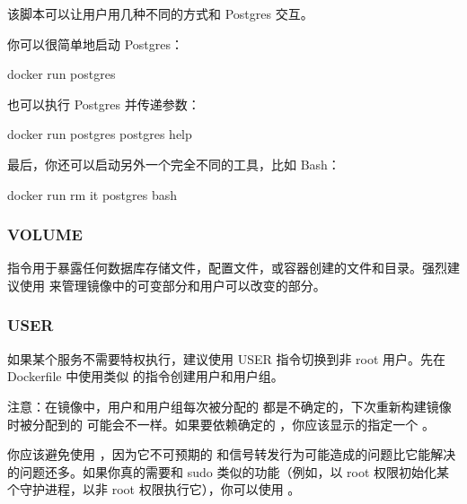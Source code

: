 \documentclass[letterpaper,10pt,english]{sphinxmanual}
\begin{document}
该脚本可以让用户用几种不同的方式和 Postgres 交互。

你可以很简单地启动 Postgres：

\begin{sphinxVerbatim}[commandchars=\\\{\}]
\PYGZdl{} docker run postgres
\end{sphinxVerbatim}

也可以执行 Postgres 并传递参数：

\begin{sphinxVerbatim}[commandchars=\\\{\}]
\PYGZdl{} docker run postgres postgres \PYGZhy{}\PYGZhy{}help
\end{sphinxVerbatim}

最后，你还可以启动另外一个完全不同的工具，比如 Bash：

\begin{sphinxVerbatim}[commandchars=\\\{\}]
\PYGZdl{} docker run \PYGZhy{}\PYGZhy{}rm \PYGZhy{}it postgres bash
\end{sphinxVerbatim}


\subsubsection{VOLUME}
\label{\detokenize{docker/appendix:volume}}
 指令用于暴露任何数据库存储文件，配置文件，或容器创建的文件和目录。强烈建议使用  来管理镜像中的可变部分和用户可以改变的部分。


\subsubsection{USER}
\label{\detokenize{docker/appendix:user}}
如果某个服务不需要特权执行，建议使用 USER 指令切换到非 root 用户。先在 Dockerfile 中使用类似  的指令创建用户和用户组。

注意：在镜像中，用户和用户组每次被分配的  都是不确定的，下次重新构建镜像时被分配到的  可能会不一样。如果要依赖确定的 ，你应该显示的指定一个 。

你应该避免使用 ，因为它不可预期的  和信号转发行为可能造成的问题比它能解决的问题还多。如果你真的需要和 sudo 类似的功能（例如，以 root 权限初始化某个守护进程，以非 root 权限执行它），你可以使用 。
\end{document}
